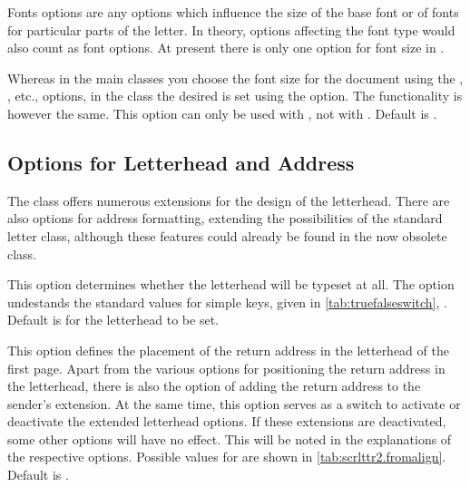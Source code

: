 Fonts options are any options which influence the size of the base
font or of fonts for particular parts of the letter. In theory,
options affecting the font type would also count as font options. At
present there is only one option for font size in .

\begin{Declaration}
\end{Declaration}
%
Whereas in the main classes you choose the font size
for the document using the \Option{10pt}, \Option{12pt}, etc.,
options, in the  class the desired  is set
using the  option. The functionality is however the
same. This option can only be used with , not
with .  Default is \PValue{12pt}.
%
%

\subsection{Options for Letterhead and Address}
\label{sec:scrlttr2.headoptions}
%

The  class offers numerous extensions for the design
of the letterhead.  There are also options for address formatting,
extending the possibilities of the standard letter class, although
these features could already be found in the now obsolete
 class.

\begin{Declaration}
\end{Declaration}
%
This option determines whether the
letterhead will be typeset at all. The option undestands the standard
values for simple keys, given
in \autoref{tab:truefalseswitch},
. Default is for the
letterhead to be set.
%

\begin{Declaration}
\end{Declaration}
%
This option defines the placement of the return address in the
letterhead of the first page. Apart from the various options for
positioning the return address in the letterhead, there is also the
option of adding the return
address to the sender's
extension. At the same
time, this option serves as a switch to activate or deactivate the
extended letterhead options. If these extensions are deactivated, some
other options will have no effect. This will be noted in the
explanations of the respective options. Possible values for
 are shown in
\autoref{tab:scrlttr2.fromalign}. Default is .

